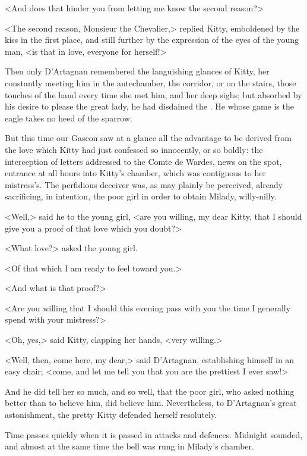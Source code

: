 <And does that hinder you from letting me know the second reason?> 

<The second reason, Monsieur the Chevalier,> replied Kitty, emboldened by the kiss in the first place, and still further by the expression of the eyes of the young man, <is that in love, everyone for herself!> 

Then only D'Artagnan remembered the languishing glances of Kitty, her constantly meeting him in the antechamber, the corridor, or on the stairs, those touches of the hand every time she met him, and her deep sighs; but absorbed by his desire to please the great lady, he had disdained the . He whose game is the eagle takes no heed of the sparrow. 

But this time our Gascon saw at a glance all the advantage to be derived from the love which Kitty had just confessed so innocently, or so boldly: the interception of letters addressed to the Comte de Wardes, news on the spot, entrance at all hours into Kitty's chamber, which was contiguous to her mistress's. The perfidious deceiver was, as may plainly be perceived, already sacrificing, in intention, the poor girl in order to obtain Milady, willy-nilly. 

<Well,> said he to the young girl, <are you willing, my dear Kitty, that I should give you a proof of that love which you doubt?> 

<What love?> asked the young girl. 

<Of that which I am ready to feel toward you.> 

<And what is that proof?> 

<Are you willing that I should this evening pass with you the time I generally spend with your mistress?> 

<Oh, yes,> said Kitty, clapping her hands, <very willing.> 

<Well, then, come here, my dear,> said D'Artagnan, establishing himself in an easy chair; <come, and let me tell you that you are the prettiest  I ever saw!> 

And he did tell her so much, and so well, that the poor girl, who asked nothing better than to believe him, did believe him. Nevertheless, to D'Artagnan's great astonishment, the pretty Kitty defended herself resolutely. 

Time passes quickly when it is passed in attacks and defences. Midnight sounded, and almost at the same time the bell was rung in Milady's chamber. 

